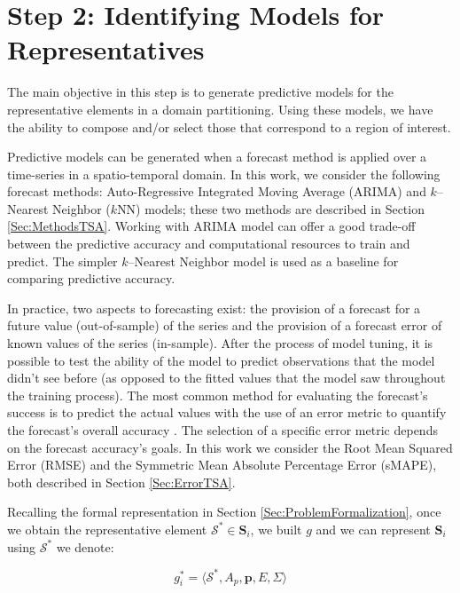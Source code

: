 \section{Step 2: Identifying Models for Representatives}
\label{Sec:ModelRepresentatives}

The main objective in this step is to generate predictive models for the representative elements in a domain partitioning. Using these models, we have the ability to compose and/or select those that correspond to a region of interest.

Predictive models can be generated when a forecast method is applied over a time-series in a spatio-temporal domain. In this work, we consider the following forecast methods: Auto-Regressive Integrated Moving Average (ARIMA) and $k$--Nearest Neighbor ($k$NN) models; these two methods are described in Section \ref{Sec:MethodsTSA}. Working with ARIMA model can offer a good trade-off between the predictive accuracy and computational resources to train and predict. The simpler $k$--Nearest Neighbor model is used as a baseline for comparing predictive accuracy.

In practice, two aspects to forecasting exist: the provision of a forecast for a future value (out-of-sample) of the series and the provision of a forecast error of known values of the series (in-sample). After the process of model tuning, it is possible to test the ability of the model to predict observations that the model didn't see before (as opposed to the fitted values that the model saw throughout the training process). The most common method for evaluating the forecast's success is to predict the actual values with the use of an error metric to quantify the forecast's overall accuracy \cite{Hyndman2006}. The selection of a specific error metric depends on the forecast accuracy's goals. In this work we consider the Root Mean Squared Error (RMSE) and the Symmetric Mean Absolute Percentage Error (sMAPE), both described in Section \ref{Sec:ErrorTSA}.

Recalling the formal representation in Section \ref{Sec:ProblemFormalization}, once we obtain the representative element $\mathcal{S}^{*} \in \mathbf{S}_{i}$, we built $g$ and we can represent $\mathbf{S}_{i}$ using $\mathcal{S}^{*}$ we denote:

\begin{equation}
g^{*}_{i} = \langle \mathcal{S}^{*}, A_p, \mathbf{p}, E, \varSigma \rangle
\end{equation}

